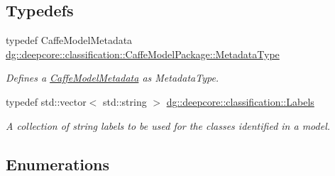 \subsection*{Typedefs}
\begin{DoxyCompactItemize}
\item 
typedef Caffe\+Model\+Metadata \hyperlink{group___classification_module_gae0f23f2d134e0b3fc83b807077e32e8b}{dg\+::deepcore\+::classification\+::\+Caffe\+Model\+Package\+::\+Metadata\+Type}
\begin{DoxyCompactList}\small\item\em Defines a \hyperlink{structdg_1_1deepcore_1_1classification_1_1_caffe_model_metadata}{Caffe\+Model\+Metadata} as Metadata\+Type. \end{DoxyCompactList}\item 
typedef std\+::vector$<$ std\+::string $>$ \hyperlink{group___classification_module_ga4c4d47162fed299b627f2e9d17381866}{dg\+::deepcore\+::classification\+::\+Labels}
\begin{DoxyCompactList}\small\item\em A collection of string labels to be used for the classes identified in a model. \end{DoxyCompactList}\end{DoxyCompactItemize}
\subsection*{Enumerations}
